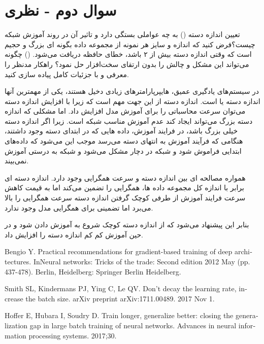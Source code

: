 \section{سوال دوم - نظری}
تعیین اندازه دسته () به چه عواملی بستگی دارد و تاثیر آن در روند آموزش شبکه چیست؟فرض کنید که اندازه و سایز هر نمونه از مجموعه داده بگونه ای بزرگ و حجیم است که وقتی اندازه دسته بیش از ۲ باشد، خطای حافظه دریافت می‌شود. () چگونه می‌تواند این مشکل و چالش را بدون ارتقای سخت‌افزار حل نمود؟ راهکار مدنظر را معرفی و با جزئیات کامل پیاده سازی کنید.







\begin{qsolve}
	در سیستم‌های یادگیری عمیق، هایپرپارامتر‌های زیادی دخیل هستند، یکی از مهمترین آنها اندازه دسته یا  است. \cite{ref1} اندازه دسته از این جهت مهم است که زیرا با افزایش اندازه دسته می‌توان سرعت محاسباتی را برای آموزش مدل افزایش داد. اما مشکلی که اندازه دسته بزرگ می‌تواند ایجاد کند عدم آموزش مناسب شبکه است. زیرا اگر اندازه دسته خیلی بزرگ باشد، در فرایند آموزش، داده هایی که در ابتدای دسته وجود داشتند، هنگامی که فرآیند آموزش به انتهای دسته می‌رسد موجب این می‌شود که داده‌های ابتدایی فراموش شود و شبکه در  دچار مشکل می‌شود و شبکه به درستی آموزش نمی‌بیند. \cite{ref2}
	
همواره مصالحه ای بین اندازه دسته و سرعت همگرایی وجود دارد. اندازه دسته ای برابر با اندازه کل مجموعه داده ها، همگرایی را تضمین می‌کند اما به قیمت کاهش سرعت فرایند آموزش از طرفی کوچک گرفتن اندازه دسته سرعت همگرایی را بالا می‌برد اما تضمینی برای همگرایی مدل وجود ندارد. \cite{ref2}

بنابر این پیشنهاد می‌شود که از اندازه دسته کوچک شروع به آموزش دادن شود و در حین آموزش کم کم اندازه دسته را افزایش داد. \cite{ref2}
	
	\begin{latin}
		\begin{thebibliography}{9}
			Bengio Y. Practical recommendations for gradient-based training of deep architectures. InNeural networks: Tricks of the trade: Second edition 2012 May (pp. 437-478). Berlin, Heidelberg: Springer Berlin Heidelberg.
			
			
			Smith SL, Kindermans PJ, Ying C, Le QV. Don't decay the learning rate, increase the batch size. arXiv preprint arXiv:1711.00489. 2017 Nov 1.
			
			Hoffer E, Hubara I, Soudry D. Train longer, generalize better: closing the generalization gap in large batch training of neural networks. Advances in neural information processing systems. 2017;30.
			
		\end{thebibliography} 
	\end{latin}
	

	
\end{qsolve}
